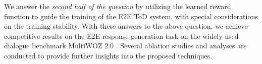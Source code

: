 We answer the \textit{second half of the question} by
utilizing the learned reward function to guide the training of the E2E ToD system, with special considerations on the training stability.
With these answers to the above question, 
we %
achieve competitive results on the E2E response-generation task on the widely-used dialogue benchmark MultiWOZ 2.0 \citep{multiwoz2018}. 
Several ablation studies and analyses are conducted to provide further insights into the proposed techniques.



